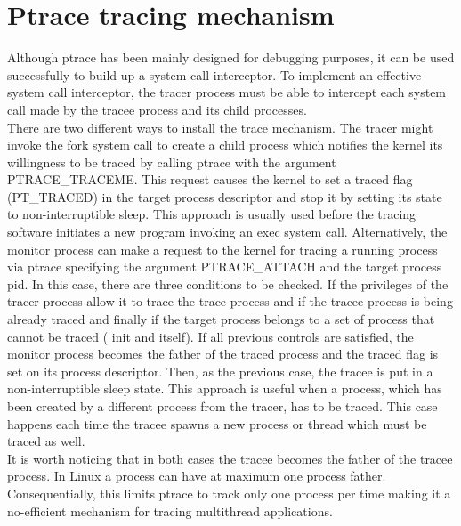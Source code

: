 \section{Ptrace tracing mechanism}
Although ptrace has been mainly designed for debugging purposes, it can be used successfully to build up a system call interceptor. To implement an effective system call interceptor, the tracer process must be able to intercept each system call made by the tracee process and its child processes.\\
There are two different ways to install the trace mechanism. The tracer might invoke the fork system call to create a child process which notifies the kernel its willingness to be traced by calling ptrace with the argument PTRACE\_TRACEME. This request causes the kernel to set a traced flag (PT\_TRACED) in the target process descriptor and stop it by setting its state to non-interruptible sleep. This approach is usually used before the tracing software initiates a new program invoking an exec system call. Alternatively, the monitor process can make a request to the kernel for tracing a running process via ptrace specifying the argument PTRACE\_ATTACH and the target process pid. In this case, there are three conditions to be checked.  If the privileges of the tracer process allow it to trace the trace process and if the tracee process is being already traced and finally if the target process belongs to a set of process that cannot be traced ( init and itself). If all previous controls are satisfied, the monitor process becomes the father of the traced process and the traced flag is set on its process descriptor. Then, as the previous case, the tracee is put in a non-interruptible sleep state.  This approach is useful when a process, which has been created by a different process from the tracer, has to be traced. This case happens each time the tracee spawns a new process or thread which must be traced as well. \\
It is worth noticing that in both cases the tracee becomes the father of the tracee process. In Linux a process can have at maximum one process father. Consequentially, this limits ptrace to track only one process per time making it a no-efficient mechanism for tracing multithread applications. \\


